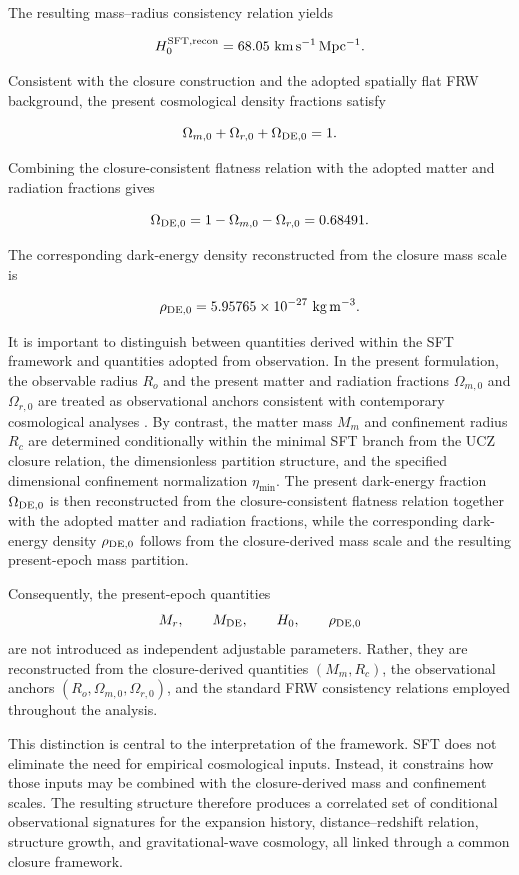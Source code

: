 \documentclass[12pt]{article}
\begin{document}
The resulting mass--radius consistency relation yields

\[
H_0^{\rm SFT,recon}
=
68.05~{\rm km\,s^{-1}\,Mpc^{-1}}.
\]

Consistent with the closure construction and the adopted spatially
flat FRW background, the present cosmological density fractions satisfy

\[
\Omega_{m,0}
+
\Omega_{r,0}
+
\Omega_{{\rm DE},0} = 1.
\]

Combining the closure-consistent flatness relation with the adopted
matter and radiation fractions gives

\[
\Omega_{{\rm DE},0} = 1-\Omega_{m,0}-\Omega_{r,0} =
0.68491.
\]

The corresponding dark-energy density reconstructed from the closure
mass scale is

\[
\rho_{{\rm DE},0} = 
5.95765\times10^{-27}
\ {\rm kg\,m^{-3}}.
\]

It is important to distinguish between quantities derived within the
SFT framework and quantities adopted from observation. In the present
formulation, the observable radius \(R_o\) and the present matter and
radiation fractions \(\Omega_{m,0}\) and \(\Omega_{r,0}\) are treated
as observational anchors consistent with contemporary cosmological
analyses \cite{Planck2020,DESI2024,Alam2021}. By contrast, the matter mass \(M_m\) and confinement radius \(R_c\)
are determined conditionally within the minimal SFT branch from the
UCZ closure relation, the dimensionless partition structure, and the
specified dimensional confinement normalization $\eta_{\min}$. The present dark-energy fraction
\(\Omega_{{\rm DE},0}\) is then reconstructed from the
closure-consistent flatness relation together with the adopted matter
and radiation fractions, while the corresponding dark-energy density
\(\rho_{{\rm DE},0}\) follows from the closure-derived mass scale and
the resulting present-epoch mass partition.

Consequently, the present-epoch quantities
\[
M_r,\qquad
M_{\rm DE},\qquad
H_0,\qquad
\rho_{{\rm DE},0}
\]
are not introduced as independent adjustable parameters. Rather, they
are reconstructed from the closure-derived quantities
\((M_m,R_c)\), the observational anchors
\((R_o,\Omega_{m,0},\Omega_{r,0})\), and the standard FRW consistency
relations employed throughout the analysis.

This distinction is central to the interpretation of the framework.
SFT does not eliminate the need for empirical cosmological inputs.
Instead, it constrains how those inputs may be combined with the
closure-derived mass and confinement scales. The resulting structure therefore produces a correlated set of conditional observational signatures for the expansion history, distance--redshift relation, structure growth,
and gravitational-wave cosmology, all linked through a common closure
framework.
\end{document}
